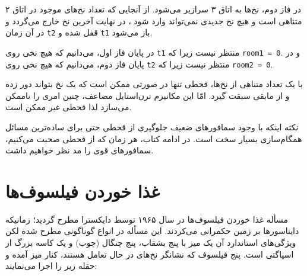 \documentclass{book}
\newcommand{\clearemptydoublepage}{\newpage\cleardoublepage}
\begin{document}
    در فاز دوم، نخ‌ها به اتاق ۳ سرازیر می‌شود. از آنجایی که تعداد نخ‌های موجود در اتاق ۲ متناهی است و هیچ نخ جدیدی نمی‌تواند وارد شود ، 
    در نهایت آخرین نخ خارج می‌گردد و در آن زمان  {\tt t2} قفل شده و  {\tt t1} باز می‌شود. 

    در پایان فاز اول، می‌دانیم که هیچ نخی روی  {\tt t1} منتظر نیست زیرا که {\tt room1 = 0}.
    و در پایان فاز دوم، می‌دانیم که هیچ نخی روی {\tt t2} منتظر نیست زیرا که {\tt room2 = 0}. 

    با یک تعداد متناهی از نخ‌ها، قحطی تنها در صورتی ممکن است که یک نخ بتواند دور زده و از مابقی سبقت گیرد.
    امّا این مکانیزم ترن‌استایل مضاعف، چنین امری را ناممکن می‌سازد لذا قحطی غیر ممکن است. 

    نکته اینکه با وجود سمافورهای ضعیف جلوگیری از قحطی حتی برای ساده‌ترین مسائل همگام‌سازی بسیار سخت است.
    در ادامه کتاب، هر زمان که از قحطی صحبت می‌کنیم، سمافورهای قوی را مد نظر خواهیم داشت. 


\clearemptydoublepage
\section
{غذا خوردن فیلسوف‌ها}
\label{dining}

    مسأله غذا خوردن فیلسوف‌ها در سال ۱۹۶۵ توسط دایکسترا مطرح گردید؛ زمانیکه دایناسورها بر زمین حکمرانی می‌کردند\cite{dijkstra65}. 
    این مسأله در انواع گوناگونی مطرح شده لکن ویژگی‌های استاندارد آن یک میز با پنج بشقاب، پنج چنگال (چوب) و یک کاسه بزرگ از اسپاگتی است. 
    پنج فیلسوف که نشانگر نخ‌های در حال تعامل هستند، کنار میز آمده و حقله زیر را اجرا می‌نمایند: 
    
\end{document}
